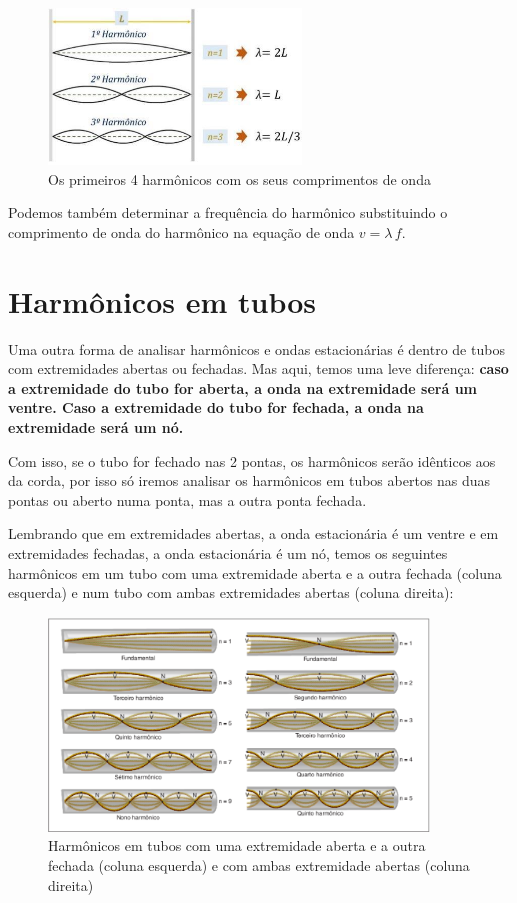 \documentclass[12pt]{extarticle}
\newcommand{\<}{\langle}
\renewcommand{\>}{\rangle}
\theoremstyle{definition}
\begin{document}
\begin{figure}[H]
    \centering
    \includegraphics[width=0.6\textwidth]{harmonico_2.jpg}
    \caption{Os primeiros 4 harmônicos com os seus comprimentos de onda}
    \label{fig:harmonico_2}
\end{figure}

Podemos também determinar a frequência do harmônico substituindo o comprimento de onda do harmônico na equação de onda $v=\lambda\,f$.

\section{Harmônicos em tubos}
Uma outra forma de analisar harmônicos e ondas estacionárias é dentro de tubos com extremidades abertas ou fechadas. Mas aqui, temos uma leve diferença: \textbf{caso a extremidade do tubo for aberta, a onda na extremidade será um ventre. Caso a extremidade do tubo for fechada, a onda na extremidade será um nó.}

Com isso, se o tubo for fechado nas 2 pontas, os harmônicos serão idênticos aos da corda, por isso só iremos analisar os harmônicos em tubos abertos nas duas pontas ou aberto numa ponta, mas a outra ponta fechada.

Lembrando que em extremidades abertas, a onda estacionária é um ventre e em extremidades fechadas, a onda estacionária é um nó, temos os seguintes harmônicos em um tubo com uma extremidade aberta e a outra fechada (coluna esquerda) e num tubo com ambas extremidades abertas (coluna direita):
\begin{figure}[H]
    \centering
    \includegraphics[width=0.9\textwidth]{tubos.png}
    \caption{Harmônicos em tubos com uma extremidade aberta e a outra fechada (coluna esquerda) e com ambas extremidade abertas (coluna direita)}
    \label{fig:tubos}
\end{figure}
\end{document}
